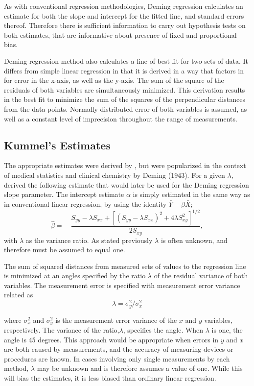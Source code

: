 \documentclass[12pt, a4paper]{report}
\theoremstyle{plain}
\theoremstyle{definition}
\theoremstyle{remark}
\begin{document}
As with conventional regression methodologies, Deming regression calculates an estimate for both the slope and intercept for the
fitted line, and standard errors thereof. Therefore there is sufficient information to carry out hypothesis tests on both
estimates, that are informative about presence of fixed and proportional bias.

Deming regression method also calculates a line of best fit for two sets of data. It differs from simple linear regression in that it is derived in a way that factors in for error in the x-axis, as well as the y-axis. The sum of the square of the residuals of both variables are simultaneously minimized. This derivation results in the best fit to minimize the sum of the squares of the perpendicular distances from the data points. Normally distributed error of both variables is assumed, as well as a constant level of imprecision throughout the range of measurements.


\subsection{Kummel's Estimates}

The appropriate estimates were derived by \citet{Kummel}, but were popularized in the context of medical statistics and clinical chemistry by Deming (1943).
For a given $\lambda$, \citet{Kummel} derived the following estimate that would later be used for the Deming regression slope
parameter. The intercept estimate $\alpha$ is simply estimated in the same way as in conventional linear
regression, by using the identity $\bar{Y}-\hat{\beta}\bar{X}$;
\begin{equation}
\hat{\beta} =\quad \frac{S_{yy} - \lambda S_{xx}+[(S_{yy} -
	\lambda S_{xx})^{2}+ 4\lambda S^{2}_{xy}]^{1/2}}{2S_{xy}},
\end{equation}
with $\lambda$ as the variance ratio. As stated previously $\lambda$ is often unknown, and therefore must be assumed to equal one. 

The sum of squared distances from measured sets of values to the regression line is minimized at an angles specified by the ratio $\lambda$ of the residual variance of both variables. The measurement error is specified with measurement error variance related as 
\[\lambda = \sigma^2_y/\sigma^2_x\]

where $\sigma^2_x$ and $\sigma^2_y$ is the measurement error variance of the $x$ and $y$ variables, respectively.
The variance of the ratio,$\lambda$, specifies the angle.  When $\lambda$ is one, the angle is 45 degrees. 
This approach would be appropriate when errors in $y$ and $x$ are both caused by measurements, and the accuracy of measuring devices or procedures are known. In cases involving only single measurements by each method, $\lambda$ may be unknown and is therefore assumes a value of one. While this will bias the estimates, it is less biased than ordinary linear regression.
\end{document}
